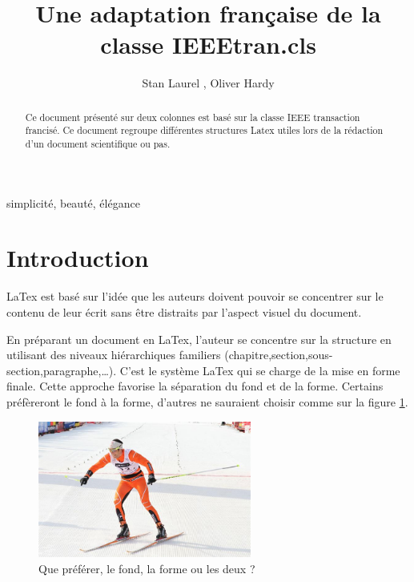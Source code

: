 \documentclass[twocolumn,a4paper]{IEEEtranfr}
\begin{document}
\title{Une adaptation française de la classe IEEEtran.cls}
\author{Stan Laurel , Oliver Hardy} 

\maketitle

\begin{abstract}
Ce document présenté sur deux colonnes est basé sur la classe IEEE transaction 
francisé. Ce document regroupe différentes structures Latex utiles lors de la rédaction d'un 
document scientifique ou pas. 
\end{abstract}

\begin{keywords}
simplicité, beauté, élégance
\end{keywords}



\section{Introduction}

 LaTex est basé sur l'idée que les auteurs doivent pouvoir se concentrer sur
le contenu de leur écrit sans être distraits par l'aspect visuel du document. 

En préparant un document en LaTex, l'auteur se concentre sur la structure en
utilisant des niveaux hiérarchiques familiers
(chapitre,section,sous-section,paragraphe,\ldots). C'est le système LaTex qui
se charge de la mise en forme finale. Cette approche favorise la séparation du
fond et de la forme. Certains préfèreront le fond à la forme, d'autres ne
sauraient choisir comme sur la figure \ref{fig:fondforme}. 

\begin{figure}[htpb]
  \begin{center}
    \includegraphics[width=7cm] {fondforme.jpg}
  \end{center}
  \caption{Que préférer, le fond, la forme ou les deux ? }
  \label{fig:fondforme}
\end{figure}
\end{document}
